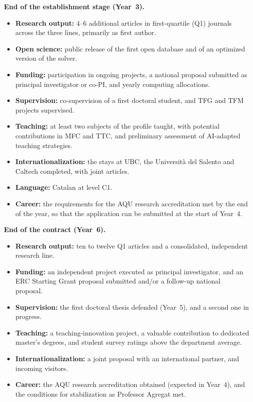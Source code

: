 \documentclass[11pt]{article}
\newcommand{\NEW}[1]{\iffinal #1\else{\color{red}#1}\fi}
\begin{document}
\noindent\textbf{End of the establishment stage (Year~3).}
\begin{itemize}
  \item \textbf{Research output:} 4--6 additional \NEW{articles in first-quartile (Q1) journals} across the three lines, primarily as first author.
  \item \textbf{Open science:} public release of the first open database and of an optimized version of the solver.
  \item \textbf{Funding:} participation in ongoing projects, a national proposal submitted as principal investigator or co-PI, and yearly computing allocations.
  \item \textbf{Supervision:} co-supervision of a first doctoral student, and TFG and TFM projects supervised.
  \item \textbf{Teaching:} at least two subjects of the profile taught, with potential contributions in MFC and TTC, and preliminary assessment of AI-adapted teaching strategies.
  \item \textbf{Internationalization:} the stays at UBC, the Universit\`a del Salento and Caltech completed, with joint articles.
  \item \textbf{Language:} Catalan at level C1.
  \item \textbf{Career:} the requirements for the AQU research accreditation met by the end of the year, so that the application can be submitted at the start of Year~4.
\end{itemize}

\noindent\textbf{End of the contract (Year~6).}
\begin{itemize}
  \item \textbf{Research output:} ten to twelve Q1 articles and a consolidated, independent research line.
  \item \textbf{Funding:} an independent project executed as principal investigator, and an ERC Starting Grant proposal submitted and/or a follow-up national proposal.
  \item \textbf{Supervision:} the first doctoral thesis defended (Year~5), and a second one in progress.
  \item \textbf{Teaching:} a teaching-innovation project, a valuable contribution to dedicated master's degrees, and student survey ratings above the department average.
  \item \textbf{Internationalization:} a joint proposal with an international partner, and incoming visitors.
  \item \textbf{Career:} the AQU research accreditation obtained (expected in Year~4), and the conditions for stabilization as Professor Agregat met.
\end{itemize}
\end{document}
